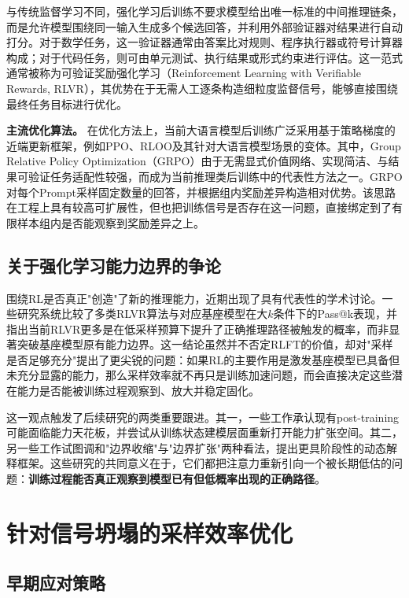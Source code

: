 与传统监督学习不同，强化学习后训练不要求模型给出唯一标准的中间推理链条，而是允许模型围绕同一输入生成多个候选回答，并利用外部验证器对结果进行自动打分。对于数学任务，这一验证器通常由答案比对规则、程序执行器或符号计算器构成；对于代码任务，则可由单元测试、执行结果或形式约束进行评估。这一范式通常被称为可验证奖励强化学习（Reinforcement Learning with Verifiable Rewards, RLVR），其优势在于无需人工逐条构造细粒度监督信号，能够直接围绕最终任务目标进行优化。

\textbf{主流优化算法。} 在优化方法上，当前大语言模型后训练广泛采用基于策略梯度的近端更新框架，例如PPO、RLOO及其针对大语言模型场景的变体。其中，Group Relative Policy Optimization（GRPO）由于无需显式价值网络、实现简洁、与结果可验证任务适配性较强，而成为当前推理类后训练中的代表性方法之一。GRPO对每个Prompt采样固定数量的回答，并根据组内奖励差异构造相对优势。该思路在工程上具有较高可扩展性，但也把训练信号是否存在这一问题，直接绑定到了有限样本组内是否能观察到奖励差异之上。

\subsection{关于强化学习能力边界的争论}
\label{subsec:rl_capability_debate}

围绕RL是否真正"创造"了新的推理能力，近期出现了具有代表性的学术讨论。一些研究系统比较了多类RLVR算法与对应基座模型在大$k$条件下的Pass@k表现，并指出当前RLVR更多是在低采样预算下提升了正确推理路径被触发的概率，而非显著突破基座模型原有能力边界。这一结论虽然并不否定RLFT的价值，却对"采样是否足够充分"提出了更尖锐的问题：如果RL的主要作用是激发基座模型已具备但未充分显露的能力，那么采样效率就不再只是训练加速问题，而会直接决定这些潜在能力是否能被训练过程观察到、放大并稳定固化。

这一观点触发了后续研究的两类重要跟进。其一，一些工作承认现有post-training可能面临能力天花板，并尝试从训练状态建模层面重新打开能力扩张空间。其二，另一些工作试图调和"边界收缩"与"边界扩张"两种看法，提出更具阶段性的动态解释框架。这些研究的共同意义在于，它们都把注意力重新引向一个被长期低估的问题：\textbf{训练过程能否真正观察到模型已有但低概率出现的正确路径}。

\section{针对信号坍塌的采样效率优化}
\label{sec:signal_efficiency_optimization}

\subsection{早期应对策略}
\label{subsec:early_solutions}

